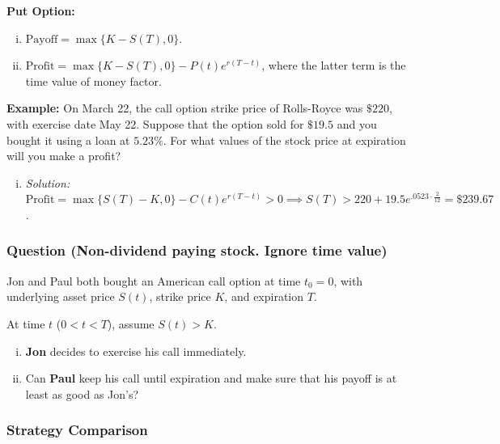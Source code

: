 \textbf{Put Option: }
\begin{enumerate}[i.]
    \item \(\text{Payoff} = \max \{K-S(T), 0\}\).
    \item \(\text{Profit} = \max \{K-S(T), 0\} - P(t)e^{r(T-t)}\), where the latter term is the time value of money factor.
\end{enumerate}

\textbf{Example: } On March 22, the call option strike price of Rolls-Royce was \(\$220\), with exercise date May 22. Suppose that the option sold for \(\$19.5\) and you bought it using a loan at \(5.23\%\). For what values of the stock price at expiration will you make a profit?
\begin{enumerate}[i.]
    \item \textit{Solution: } \(\text{Profit} = \max \{S(T) - K, 0\} - C(t)e^{r(T-t)} > 0 \implies S(T) > 220 + 19.5e^{.0523 \cdot \frac{2}{12}} = \$239.67\).
\end{enumerate}

\subsubsection*{Question (Non-dividend paying stock. Ignore time value)}
Jon and Paul both bought an American call option at time $t_0 = 0$, with underlying asset price $S(t)$, strike price $K$, and expiration $T$.

At time $t$ ($0 < t < T$), assume $S(t) > K$.
\begin{enumerate}[i.]
    \item \textbf{Jon} decides to exercise his call immediately.
    \item Can \textbf{Paul} keep his call until expiration and make sure that his payoff is at least as good as Jon's?
\end{enumerate}

\subsubsection*{Strategy Comparison}

